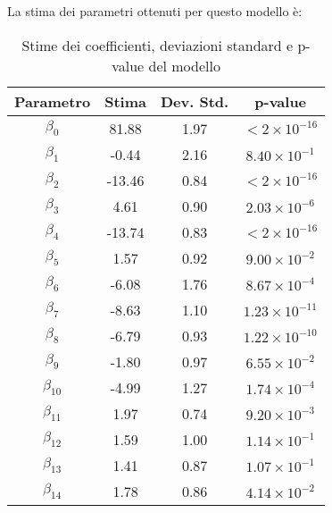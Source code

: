 La stima dei parametri ottenuti per questo modello è:
\begin{table}[H]
	\centering
	\begin{tabular}{|c|c|c|c|}
		\hline
		\textbf{Parametro} & \textbf{Stima} & \textbf{Dev. Std.} & \textbf{p-value} \\
		\hline
		$\beta_0$  & 81.88   & 1.97  & \(< 2 \times 10^{-16}\) \\
		$\beta_1$  & -0.44   & 2.16  & \(8.40 \times 10^{-1}\) \\
		$\beta_2$  & -13.46  & 0.84  & \(< 2 \times 10^{-16}\) \\
		$\beta_3$  & 4.61    & 0.90  & \(2.03 \times 10^{-6}\) \\
		$\beta_4$  & -13.74  & 0.83  & \(< 2 \times 10^{-16}\) \\
		$\beta_5$  & 1.57    & 0.92  & \(9.00 \times 10^{-2}\) \\
		$\beta_6$  & -6.08   & 1.76  & \(8.67 \times 10^{-4}\) \\
		$\beta_7$  & -8.63   & 1.10  & \(1.23 \times 10^{-11}\) \\
		$\beta_8$  & -6.79   & 0.93  & \(1.22 \times 10^{-10}\) \\
		$\beta_9$  & -1.80   & 0.97  & \(6.55 \times 10^{-2}\) \\
		$\beta_{10}$ & -4.99 & 1.27  & \(1.74 \times 10^{-4}\) \\
		$\beta_{11}$ & 1.97  & 0.74  & \(9.20 \times 10^{-3}\) \\
		$\beta_{12}$ & 1.59  & 1.00  & \(1.14 \times 10^{-1}\) \\
		$\beta_{13}$ & 1.41  & 0.87  & \(1.07 \times 10^{-1}\) \\
		$\beta_{14}$ & 1.78  & 0.86  & \(4.14 \times 10^{-2}\) \\
		\hline
	\end{tabular}
	\caption{Stime dei coefficienti, deviazioni standard e p-value del modello}
	\label{tab:coef_model_completo}
\end{table}

